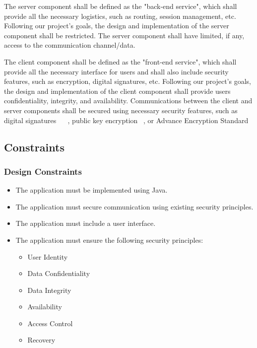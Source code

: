 \documentclass[sigconf]{acmart}
\begin{document}
The server component shall be defined as the "back-end service", which shall provide all the
necessary logistics, such as routing, session management, etc. Following our project's goals, the
design and implementation of the server component shall be restricted. The server component shall
have limited, if any, access to the communication channel/data.

The client component shall be defined as the "front-end service", which shall provide all the
necessary interface for users and shall also include security features, such as encryption, digital
signatures, etc. Following our project's goals, the design and implementation of the client
component shall provide users confidentiality, integrity, and availability. Communications between
the client and server components shall be secured using necessary security features, such as
digital signatures ~\cite{Fersch:provable} ~\cite{Meijer:signature}, public key encryption
~\cite{Kuchlin:publickey}, or Advance Encryption Standard ~\cite{Jariwala:taxonomy}

\subsection{Constraints}

\subsubsection{Design Constraints}
\begin{itemize}
	\item The application must be implemented using Java.
	\item The application must secure communication using existing security principles.
	\item The application must include a user interface.
	\item The application must ensure the following security principles:
	      \begin{itemize}
	      	\item User Identity
	      	\item Data Confidentiality
	      	\item Data Integrity
	      	\item Availability
	      	\item Access Control
	      	\item Recovery
	      \end{itemize}
\end{itemize}
\end{document}
